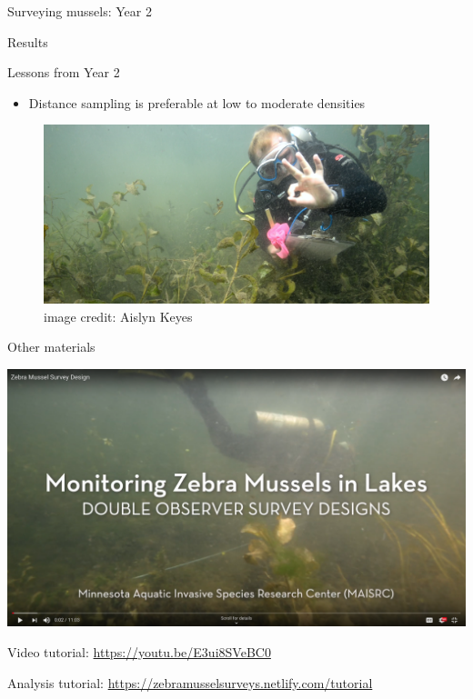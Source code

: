 \documentclass[ignorenonframetext,]{beamer}
\providecommand{\tightlist}{%
  \setlength{\itemsep}{0pt}\setlength{\parskip}{0pt}}
\begin{document}
\begin{frame}{Surveying mussels: Year 2}
\begin{block}{Results}
\end{block}

\begin{block}{Lessons from Year 2}

\begin{itemize}
\tightlist
\item
  Distance sampling is preferable at low to moderate densities
\end{itemize}

\begin{figure}

{\centering \includegraphics[width=0.7\linewidth]{../Figures/AustenDistance} 

}

\caption{image credit: Aislyn Keyes}\label{fig:unnamed-chunk-17}
\end{figure}

\end{block}

\begin{block}{Other materials}

\begin{center}\includegraphics[width=0.7\linewidth]{../Figures/Youtube} \end{center}

Video tutorial: \url{https://youtu.be/E3ui8SVeBC0}

Analysis tutorial: \url{https://zebramusselsurveys.netlify.com/tutorial}

\end{block}

\end{frame}
\end{document}
